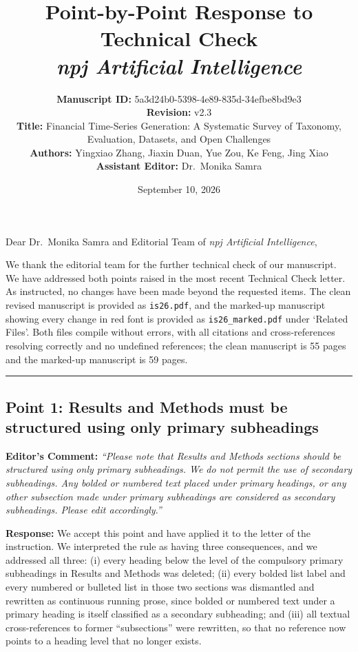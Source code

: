 \documentclass[11pt,a4paper]{article}
\title{\textbf{Point-by-Point Response to Technical Check}\\[0.3em]
\large \textit{npj Artificial Intelligence}}
\author{\textbf{Manuscript ID:} 5a3d24b0-5398-4e89-835d-34efbe8bd9e3\\
\textbf{Revision:} v2.3\\
\textbf{Title:} Financial Time-Series Generation: A Systematic Survey of Taxonomy, Evaluation, Datasets, and Open Challenges\\
\textbf{Authors:} Yingxiao Zhang, Jiaxin Duan, Yue Zou, Ke Feng, Jing Xiao\\
\textbf{Assistant Editor:} Dr.~Monika Samra}
\date{September 10, 2026}
\begin{document}
\maketitle

\noindent Dear Dr.~Monika Samra and Editorial Team of \textit{npj Artificial Intelligence},

\vspace{0.8em}
\noindent We thank the editorial team for the further technical check of our manuscript. We have addressed both points raised in the most recent Technical Check letter. As instructed, no changes have been made beyond the requested items. The clean revised manuscript is provided as \texttt{is26.pdf}, and the marked-up manuscript showing every change in red font is provided as \texttt{is26\_marked.pdf} under `Related Files'. Both files compile without errors, with all citations and cross-references resolving correctly and no undefined references; the clean manuscript is 55 pages and the marked-up manuscript is 59 pages.

\vspace{1.5em}
\hrule
\vspace{1.5em}

\subsection*{Point 1: Results and Methods must be structured using only primary subheadings}

\vspace{0.5em}
\noindent\textbf{Editor's Comment:}
\textit{``Please note that Results and Methods sections should be structured using only primary subheadings. We do not permit the use of secondary subheadings. Any bolded or numbered text placed under primary headings, or any other subsection made under primary subheadings are considered as secondary subheadings. Please edit accordingly.''}

\vspace{0.5em}
\noindent\textbf{Response:}
We accept this point and have applied it to the letter of the instruction. We interpreted the rule as having three consequences, and we addressed all three: (i) every heading below the level of the compulsory primary subheadings in Results and Methods was deleted; (ii) every bolded list label and every numbered or bulleted list in those two sections was dismantled and rewritten as continuous running prose, since bolded or numbered text under a primary heading is itself classified as a secondary subheading; and (iii) all textual cross-references to former ``subsections'' were rewritten, so that no reference now points to a heading level that no longer exists.
\end{document}
